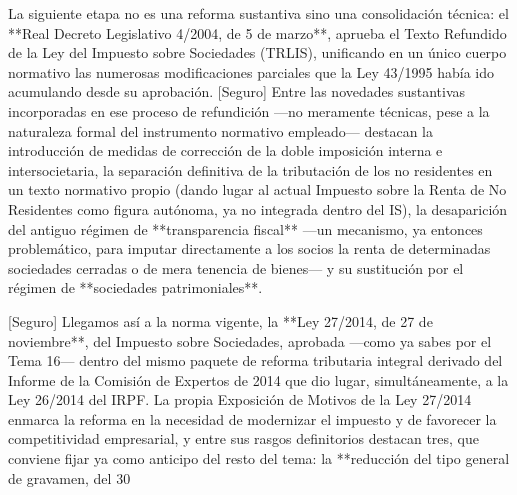 \documentclass[10pt,a4paper]{article}
\begin{document}
La siguiente etapa no es una reforma sustantiva sino una consolidación técnica: el **Real Decreto Legislativo 4/2004, de 5 de marzo**, aprueba el Texto Refundido de la Ley del Impuesto sobre Sociedades (TRLIS), unificando en un único cuerpo normativo las numerosas modificaciones parciales que la Ley 43/1995 había ido acumulando desde su aprobación. [Seguro] Entre las novedades sustantivas incorporadas en ese proceso de refundición —no meramente técnicas, pese a la naturaleza formal del instrumento normativo empleado— destacan la introducción de medidas de corrección de la doble imposición interna e intersocietaria, la separación definitiva de la tributación de los no residentes en un texto normativo propio (dando lugar al actual Impuesto sobre la Renta de No Residentes como figura autónoma, ya no integrada dentro del IS), la desaparición del antiguo régimen de **transparencia fiscal** —un mecanismo, ya entonces problemático, para imputar directamente a los socios la renta de determinadas sociedades cerradas o de mera tenencia de bienes— y su sustitución por el régimen de **sociedades patrimoniales**.

[Seguro] Llegamos así a la norma vigente, la **Ley 27/2014, de 27 de noviembre**, del Impuesto sobre Sociedades, aprobada —como ya sabes por el Tema 16— dentro del mismo paquete de reforma tributaria integral derivado del Informe de la Comisión de Expertos de 2014 que dio lugar, simultáneamente, a la Ley 26/2014 del IRPF. La propia Exposición de Motivos de la Ley 27/2014 enmarca la reforma en la necesidad de modernizar el impuesto y de favorecer la competitividad empresarial, y entre sus rasgos definitorios destacan tres, que conviene fijar ya como anticipo del resto del tema: la **reducción del tipo general de gravamen, del 30%
\end{document}
